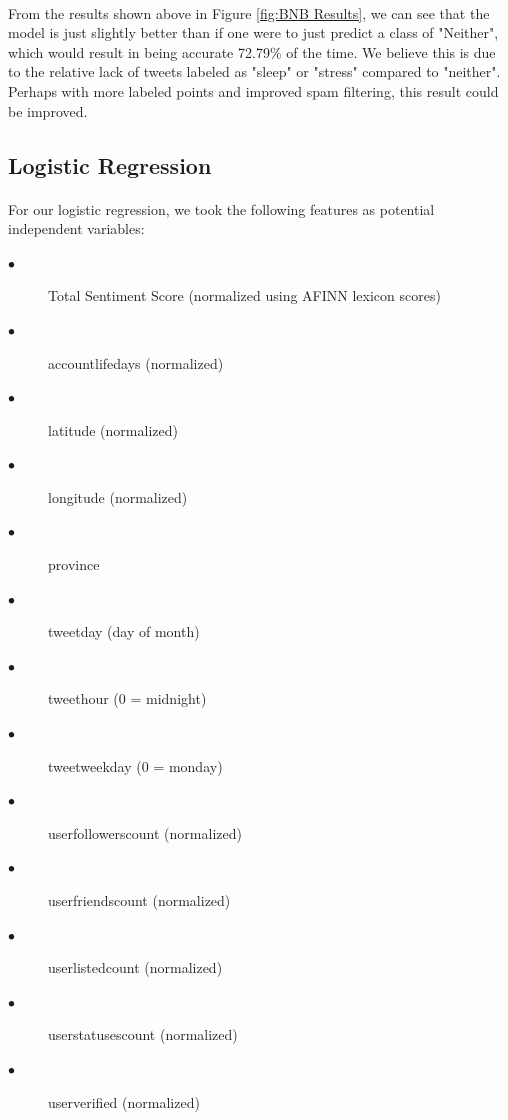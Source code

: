 \documentclass{article}
\begin{document}
\paragraph{}
From the results shown above in Figure \ref{fig:BNB Results}, we can see that the model is just slightly better than if one were to just predict a class of "Neither", which would result in being accurate 72.79\% of the time.  We believe this is due to the relative lack of tweets labeled as "sleep" or "stress" compared to "neither".  Perhaps with more labeled points and improved spam filtering, this result could be improved.


\subsection{Logistic Regression}
\paragraph{}
For our logistic regression, we took the following features as potential independent variables:  

\begin{description}
  \item[$\bullet$ ] Total Sentiment Score (normalized using AFINN lexicon scores)
  \item[$\bullet$ ] account\textunderscore life\textunderscore days (normalized)
  \item[$\bullet$ ] latitude (normalized)
  \item[$\bullet$ ] longitude (normalized)
  \item[$\bullet$ ] province
  \item[$\bullet$ ] tweet\textunderscore day (day of month)
  \item[$\bullet$ ] tweet\textunderscore hour (0 = midnight)
  \item[$\bullet$ ] tweet\textunderscore weekday (0 = monday)
  \item[$\bullet$ ] user\textunderscore followers\textunderscore count (normalized)
  \item[$\bullet$ ] user\textunderscore friends\textunderscore count (normalized)
  \item[$\bullet$ ] user\textunderscore listed\textunderscore count (normalized)
  \item[$\bullet$ ] user\textunderscore statuses\textunderscore count (normalized)
  \item[$\bullet$ ] user\textunderscore verified (normalized)
\end{description}
\end{document}
